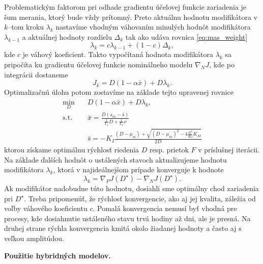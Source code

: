 Problematickým faktorom pri odhade gradientu účelovej funkcie zariadenia je šum merania, ktorý bude vždy prítomný. Preto aktuálnu hodnotu modifikátora v $ k $--tom kroku $ \lambda_k $ nastavíme vhodným váhovaním minulých hodnôt modifikátora $ \lambda_{k-1} $ a aktuálnej hodnoty rozdielu $ \Delta_{k} $ tak ako udáva rovnica \eqref{eq:mas_weight}
\begin{equation*}
	\lambda_k = c\lambda_{k-1} + \left(1 - c\right)\Delta_{k},
\end{equation*}
kde $ c $ je váhový koeficient. Takto vypočítaná hodnota modifikátora $ \lambda_k $ sa pripočíta ku gradientu účelovej funkcie nominálneho modelu $ \nabla_{N}J $, kde po integrácii dostaneme
\begin{equation}
	J_{k} = D\left(1-\alpha\bar{x}\right) + D\lambda_k.
\end{equation}
Optimalizačnú úlohu potom zostavíme na základe tejto upravenej rovnice
\begin{equation}
	\begin{split}
		\min_{D} &\quad D\left(1-\alpha\bar{x}\right) + D\lambda_k, \\
		\text{s.t.} &\quad \bar{x} = \frac{D\left(s_{in}-\bar{s}\right)}{\frac{1}{Y_{x}}D + \frac{1}{Y_{x}}\nu} \\
		&\quad \bar{s} = -K_{I}\frac{\left(D-\mu_{m}\right) + \sqrt{\left(D-\mu_{m}\right)^2 - 4\frac{D^2}{K_{I}}K_{M}}}{2D}
	\end{split}
\end{equation}
ktorou získame optimálnu rýchlosť riedenia $ D $ resp. prietok $ F $ v príslušnej iterácii. Na základe ďalších hodnôt o ustálených stavoch aktualizujeme hodnotu modifikátora $ \lambda_k $, ktorá v najideálnejšom prípade konverguje k hodnote
\begin{equation}
	\lambda_k = \nabla_{P}J\left(D^{\star}\right) - \nabla_{N}J\left(D^{\star}\right).
\end{equation} 
Ak modifikátor nadobudne túto hodnotu, dosiahli sme optimálny chod zariadenia pri $ D^{\star} $. Treba pripomenúť, že rýchlosť konvergencie, ako aj jej kvalita, záležia od voľby váhového koeficientu $ c $. Pomalá konvergencia nemusí byť vhodná pre procesy, kde dosiahnutie ustáleného stavu trvá hodiny až dni, ale je presná. Na druhej strane rýchla konvergencia kmitá okolo žiadanej hodnoty a často aj s veľkou amplitúdou.

\textbf{Použitie hybridných modelov.}
